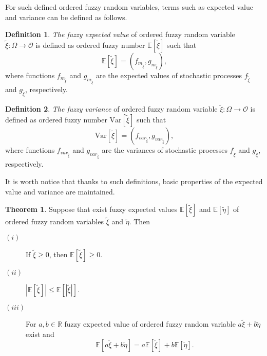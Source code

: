 \documentclass[review]{elsarticle}
\theoremstyle{definition}
\newtheorem{definition}{Definition}
\theoremstyle{theorem}
\newtheorem{theorem}{Theorem}
\begin{document}
For such defined ordered fuzzy random variables, terms such as expected value and variance can be defined as follows.

\begin{definition}
{\it The fuzzy expected value} of ordered fuzzy random variable $\tilde{\xi}\colon\Omega\to\mathcal{O}$ is defined as ordered fuzzy number $\mathbb{E}[\tilde{\xi}]$ such that
\begin{equation}
\mathbb{E}[\tilde{\xi}]=\left(f_{m_{\tilde{\xi}}}, g_{m_{\tilde{\xi}}} \right),
\end{equation} 
where functions $f_{m_{\tilde{\xi}}}$ and $g_{m_{\tilde{\xi}}}$ are the expected values of stochastic processes $f_{\tilde{\xi}}$ and $g_{\tilde{\xi}}$, respectively.
\end{definition}

\begin{definition}
{\it The fuzzy variance} of ordered fuzzy random variable $\tilde{\xi}\colon\Omega\to\mathcal{O}$ is defined as ordered fuzzy number $\mathrm{Var}[\tilde{\xi}]$ such that
\begin{equation}
\mathrm{Var}[\tilde{\xi}]=\left(f_{var_{\tilde{\xi}}}, g_{var_{\tilde{\xi}}} \right),
\end{equation}
where functions $f_{var_{\tilde{\xi}}}$ and $g_{var_{\tilde{\xi}}}$ are the variances of stochastic processes $f_{\tilde{\xi}}$ and $g_{\tilde{\xi}}$, respectively.
\end{definition}

It is worth notice that thanks to such definitions, basic properties of the expected value and variance are maintained.

\begin{theorem}
Suppose that exist fuzzy expected values $ \mathbb{E}[\tilde{\xi}] $ and $ \mathbb{E}[\tilde{\eta}]$ of ordered fuzzy random variables $ \tilde{\xi}$ and $ \tilde{\eta} $. Then
\begin{description}
\item[$(i)$] If $\tilde{\xi}\geq 0$, then $\mathbb{E}[\tilde{\xi}]\geq 0$.
\item[$(ii)$] $|\mathbb{E}[\tilde{\xi}]|\leq \mathbb{E}[|\tilde{\xi}|]$.
\item[$(iii)$] For $a,b\in\mathbb{R}$ fuzzy expected value of ordered fuzzy random variable $a\tilde{\xi}+b\tilde{\eta}$ exist and
$$\mathbb{E}[a\tilde{\xi}+b\tilde{\eta}]=a\mathbb{E}[\tilde{\xi}]+b\mathbb{E}[\tilde{\eta}].$$
\end{description}
\end{theorem}
\end{document}
